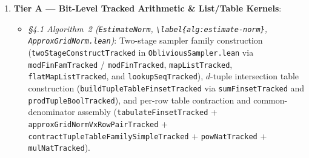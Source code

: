 \documentclass[10pt,letterpaper]{article}
\renewcommand{\_}{\origunderscore\allowbreak}
\newcommand{\code}[1]{\texttt{#1}}
\begin{document}
\begin{enumerate}
  \item \textbf{Tier A --- Bit-Level Tracked Arithmetic \& List/Table Kernels}:
  \begin{itemize}
    \item \emph{\S 4.1 Algorithm~2 (\code{EstimateNorm}, \code{\textbackslash label\{alg:estimate-norm\}}, \code{ApproxGridNorm.lean})}: Two-stage sampler family construction (\code{twoStageConstructTracked} in \code{ObliviousSampler.lean} via \code{modFinFamTracked} / \code{modFinTracked}, \code{mapListTracked}, \code{flatMapListTracked}, and \code{lookupSeqTracked}), $d$-tuple intersection table construction (\code{buildTupleTableFinsetTracked} via \code{sumFinsetTracked} and \code{prodTupleBoolTracked}), and per-row table contraction and common-denominator assembly (\code{tabulateFinsetTracked} + \code{approxGridNormVxRowPairTracked} + \code{contractTupleTableFamilySimpleTracked} + \code{powNatTracked} + \code{mulNatTracked}).

\end{itemize}
\end{enumerate}
\end{document}
